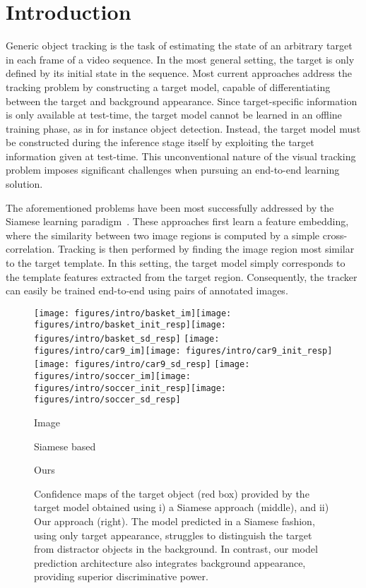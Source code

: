 \documentclass[10pt,twocolumn,letterpaper]{article}
\begin{document}
\section{Introduction}
Generic object tracking is the task of estimating the state of an arbitrary target in each frame of a video sequence. In the most general setting, the target is only defined by its initial state in the sequence. Most current approaches address the tracking problem by constructing a target model, capable of differentiating between the target and background appearance. Since target-specific information is only available at test-time, the target model cannot be learned in an offline training phase, as in for instance object detection. Instead, the target model must be constructed during the inference stage itself by exploiting the target information given at test-time. 
This unconventional nature of the visual tracking problem imposes significant challenges when pursuing an end-to-end learning solution.

The aforementioned problems have been most successfully addressed by the Siamese learning paradigm~\cite{SiameseFC,SiamRPN}.
These approaches first learn a feature embedding, where the similarity between two image regions is computed by a simple cross-correlation. Tracking is then performed by finding the image region most similar to the target template. In this setting, the target model simply corresponds to the template features extracted from the target region. Consequently, the tracker can easily be trained end-to-end using pairs of annotated images.

\begin{figure}[!t]
	\centering \newcommand{\wid}{0.33\columnwidth}\texttt{[image: figures/intro/basket\_im]}\texttt{[image: figures/intro/basket\_init\_resp]}\texttt{[image: figures/intro/basket\_sd\_resp]}
	\texttt{[image: figures/intro/car9\_im]}\texttt{[image: figures/intro/car9\_init\_resp]}\texttt{[image: figures/intro/car9\_sd\_resp]}
	\texttt{[image: figures/intro/soccer\_im]}\texttt{[image: figures/intro/soccer\_init\_resp]}\texttt{[image: figures/intro/soccer\_sd\_resp]}\vspace{-0.5mm}
	\parbox{.32\columnwidth}{\centering\small Image}\parbox{.32\columnwidth}{\centering\small Siamese based}\parbox{.32\columnwidth}{\centering\small Ours}
	\caption{
		Confidence maps of the target object (red box) provided by the target model obtained using i) a Siamese approach (middle), and ii) Our  approach (right). The model predicted in a Siamese fashion, using only target appearance, struggles to distinguish the target from distractor objects in the background. In contrast, our model prediction architecture also integrates background appearance, providing superior discriminative power.}\vspace{-2.5mm}\label{fig:intro}\end{figure}
\end{document}

